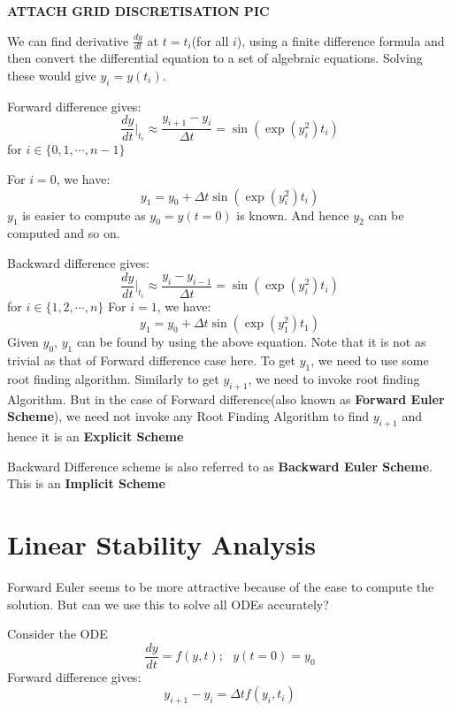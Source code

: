\documentclass[
]{book}
\begin{document}
\textbf{ATTACH GRID DISCRETISATION PIC}

We can find derivative \(\frac{dy}{dt}\) at \(t=t_i\)(for all \(i\)), using a finite difference formula and then convert the differential equation to a set of algebraic equations. Solving these would give \(y_i = y(t_i)\).

Forward difference gives:
\begin{equation}
\frac{dy}{dt}|_{t_i}\approx \frac{y_{i+1}-y_i}{\Delta t} = \sin(\exp(y_i^2)t_i)
\end{equation}
for \(i\in\{0,1,\cdots, n-1\}\)

For \(i=0\), we have:
\begin{equation}
y_1 = y_0 +\Delta t \sin(\exp(y_i^2)t_i)
\end{equation}
\(y_1\) is easier to compute as \(y_0 = y(t=0)\) is known. And hence \(y_2\) can be computed and so on.

Backward difference gives:
\begin{equation}
\frac{dy}{dt}|_{t_i}\approx \frac{y_{i}-y_{i-1}}{\Delta t} = \sin(\exp(y_i^2)t_i)
\end{equation}
for \(i\in\{1,2, \cdots,n\}\)
For \(i=1\), we have:
\begin{equation}
y_1 = y_0 +\Delta t \sin(\exp(y_1^2)t_1)
\end{equation}
Given \(y_0\), \(y_1\) can be found by using the above equation. Note that it is not as trivial as that of Forward difference case here. To get \(y_1\), we need to use some root finding algorithm. Similarly to get \(y_{i+1}\), we need to invoke root finding Algorithm. But in the case of Forward difference(also known as \textbf{Forward Euler Scheme}), we need not invoke any Root Finding Algorithm to find \(y_{i+1}\) and hence it is an \textbf{Explicit Scheme}

Backward Difference scheme is also referred to as \textbf{Backward Euler Scheme}. This is an \textbf{Implicit Scheme}

\hypertarget{linear-stability-analysis}{%
\section{Linear Stability Analysis}\label{linear-stability-analysis}}

Forward Euler seems to be more attractive because of the ease to compute the solution. But can we use this to solve all ODEs accurately?

Consider the ODE \[\frac{dy}{dt} = f(y,t); \ \ \ y(t=0)=y_0\]
Forward difference gives:
\begin{equation}
y_{i+1}-y_i = \Delta t f(y_i,t_i)
\end{equation}
\end{document}
